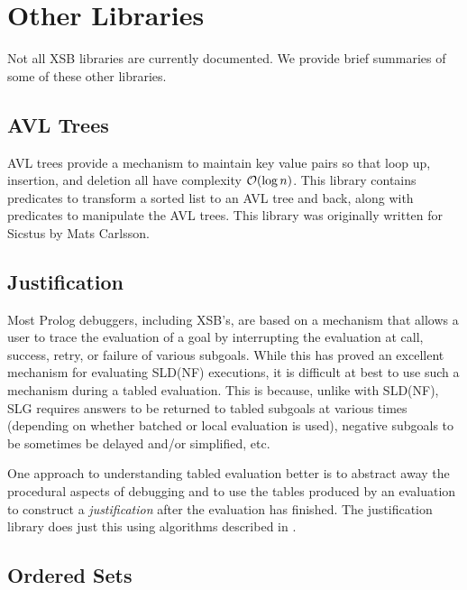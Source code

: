 \section{Other Libraries}

Not all XSB libraries are currently documented.  We provide brief
summaries of some of these other libraries.

\subsection{AVL Trees}

AVL trees provide a mechanism to maintain key value pairs so that loop
up, insertion, and deletion all have complexity ${\cal O}(\log n)$.  This
library contains predicates to transform a sorted list to an AVL tree
and back, along with predicates to manipulate the AVL trees.  This
library was originally written for Sicstus by Mats Carlsson.



\subsection{Justification}

Most Prolog debuggers, including XSB's, are based on a mechanism that
allows a user to trace the evaluation of a goal by interrupting the
evaluation at call, success, retry, or failure of various subgoals.
While this has proved an excellent mechanism for evaluating SLD(NF)
executions, it is difficult at best to use such a mechanism during a
tabled evaluation.  This is because, unlike with SLD(NF), SLG requires
answers to be returned to tabled subgoals at various times (depending
on whether batched or local evaluation is used), negative subgoals to
be sometimes be delayed and/or simplified, etc.

One approach to understanding tabled evaluation better is to abstract
away the procedural aspects of debugging and to use the tables
produced by an evaluation to construct a {\em justification} after the
evaluation has finished.  The justification library does just this
using algorithms described in \cite{GuRR01}.

\subsection{Ordered Sets}

